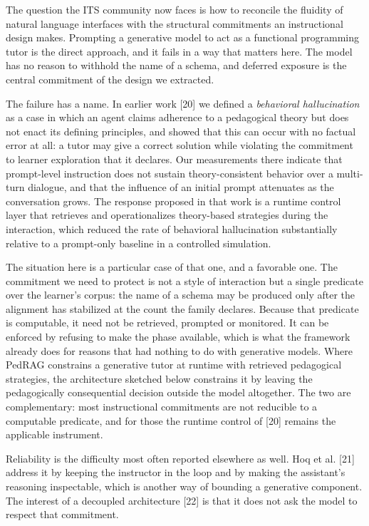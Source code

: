 \documentclass[10pt,twocolumn,letterpaper]{article}
\begin{document}
The question the ITS community now faces is how to reconcile the fluidity of natural language interfaces with the structural commitments an instructional design makes. Prompting a generative model to act as a functional programming tutor is the direct approach, and it fails in a way that matters here. The model has no reason to withhold the name of a schema, and deferred exposure is the central commitment of the design we extracted.

The failure has a name. In earlier work [20] we defined a \emph{behavioral hallucination} as a case in which an agent claims adherence to a pedagogical theory but does not enact its defining principles, and showed that this can occur with no factual error at all: a tutor may give a correct solution while violating the commitment to learner exploration that it declares. Our measurements there indicate that prompt-level instruction does not sustain theory-consistent behavior over a multi-turn dialogue, and that the influence of an initial prompt attenuates as the conversation grows. The response proposed in that work is a runtime control layer that retrieves and operationalizes theory-based strategies during the interaction, which reduced the rate of behavioral hallucination substantially relative to a prompt-only baseline in a controlled simulation.

The situation here is a particular case of that one, and a favorable one. The commitment we need to protect is not a style of interaction but a single predicate over the learner's corpus: the name of a schema may be produced only after the alignment has stabilized at the count the family declares. Because that predicate is computable, it need not be retrieved, prompted or monitored. It can be enforced by refusing to make the phase available, which is what the framework already does for reasons that had nothing to do with generative models. Where PedRAG constrains a generative tutor at runtime with retrieved pedagogical strategies, the architecture sketched below constrains it by leaving the pedagogically consequential decision outside the model altogether. The two are complementary: most instructional commitments are not reducible to a computable predicate, and for those the runtime control of [20] remains the applicable instrument.

Reliability is the difficulty most often reported elsewhere as well. Hoq et al. [21] address it by keeping the instructor in the loop and by making the assistant's reasoning inspectable, which is another way of bounding a generative component. The interest of a decoupled architecture [22] is that it does not ask the model to respect that commitment.
\end{document}
